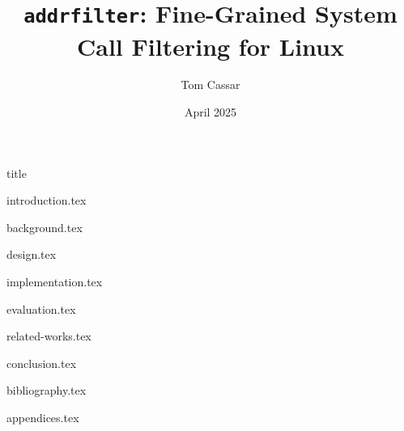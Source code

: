 \documentclass[fontsize=14pt]{article}
\title{\texttt{addrfilter}: Fine-Grained System Call Filtering for Linux}
\author{Tom Cassar}
\date{April 2025}
\begin{document}
\maketitle

\thispagestyle{empty}


\clearpage
\setcounter{page}{1}
{title}

\clearpage


{introduction.tex}

\clearpage

{background.tex}

\clearpage

{design.tex}

\clearpage

{implementation.tex}

\clearpage

{evaluation.tex}

\clearpage

{related-works.tex}

\clearpage

{conclusion.tex}

\clearpage

{bibliography.tex}

\clearpage

{appendices.tex}
\end{document}
